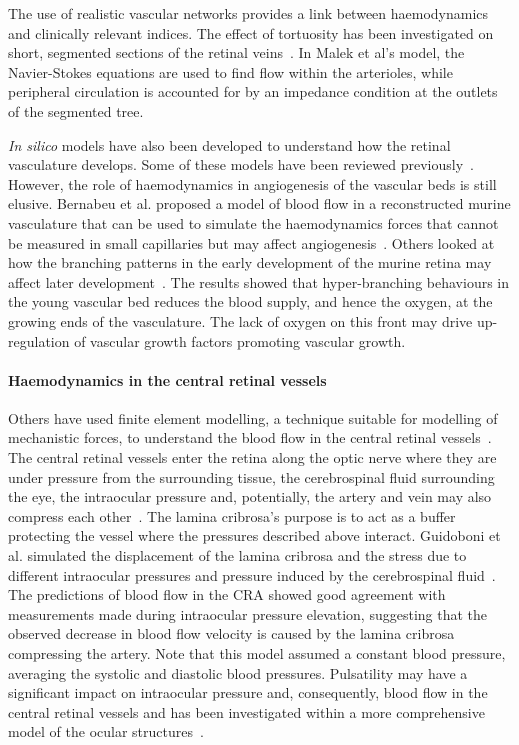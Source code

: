 \documentclass{article}
\begin{document}
The use of realistic vascular networks provides a link between haemodynamics and clinically relevant indices.
The effect of tortuosity has been investigated on short, segmented sections of the retinal veins~\cite{Malek_2014}.
In Malek et al's model, the Navier-Stokes equations are used to find flow within the arterioles, while peripheral circulation is accounted for by an impedance condition at the outlets of the segmented tree.

\textit{In silico} models have also been developed to understand how the retinal vasculature develops.
Some of these models have been reviewed previously~\cite{Arciero_2019,Roberts_2016}.
However, the role of haemodynamics in angiogenesis of the vascular beds is still elusive.
Bernabeu et al. proposed a model of blood flow in a reconstructed murine vasculature that can be used to simulate the haemodynamics forces that cannot be measured in small capillaries but may affect angiogenesis~\cite{Bernabeu_2014}.
Others looked at how the branching patterns in the early development of the murine retina may affect later development~\cite{Mirzapour_Shafiyi_2021}.
The results showed that hyper-branching behaviours in the young vascular bed reduces the blood supply, and hence the oxygen, at the growing ends of the vasculature.
The lack of oxygen on this front may drive up-regulation of vascular growth factors promoting vascular growth.


\paragraph*{Haemodynamics in the central retinal vessels}

Others have used finite element modelling, a technique suitable for modelling of mechanistic forces, to understand the blood flow in the central retinal vessels~\cite{Guidoboni_2014,Jin_2020}.
The central retinal vessels enter the retina along the optic nerve where they are under pressure from the surrounding tissue, the cerebrospinal fluid surrounding the eye, the intraocular pressure and, potentially, the artery and vein may also compress each other~\cite{Nickells_2012}.
The lamina cribrosa's purpose is to act as a buffer protecting the vessel where the pressures described above interact.
Guidoboni et al. simulated the displacement of the lamina cribrosa and the stress due to different intraocular pressures and pressure induced by the cerebrospinal fluid~\cite{Guidoboni_2014}.
The predictions of blood flow in the CRA showed good agreement with measurements made during intraocular pressure elevation, suggesting that the observed decrease in blood flow velocity is caused by the lamina cribrosa compressing the artery.
Note that this model assumed a constant blood pressure, averaging the systolic and diastolic blood pressures.
Pulsatility may have a significant impact on intraocular pressure and, consequently, blood flow in the central retinal vessels and has been investigated within a more comprehensive model of the ocular structures~\cite{Jin_2020}.
\end{document}
